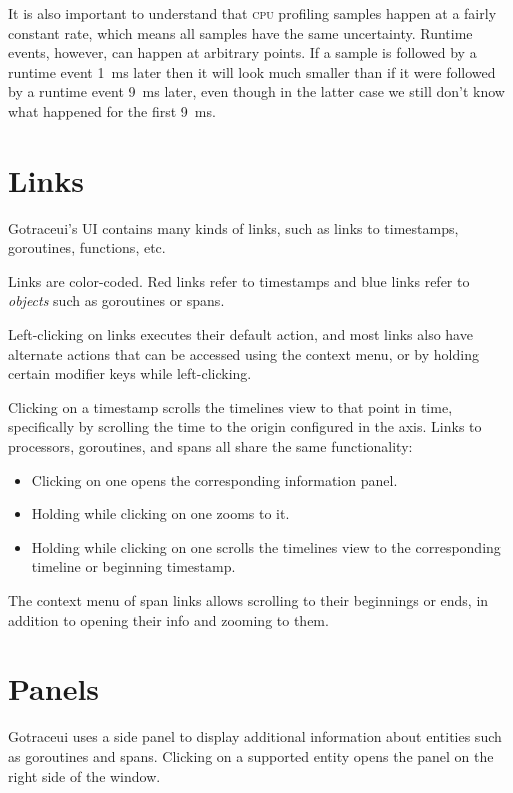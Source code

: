 \documentclass[10pt,letterpaper,oneside,openany,english]{memoir}
\newcommand{\shortcut}{\ctrl{} or \cmdmac}
\begin{document}
It is also important to understand that \textsc{cpu} profiling samples happen at a fairly constant rate, which means all samples have the same uncertainty.
Runtime events, however, can happen at arbitrary points.
If a sample is followed by a runtime event \qty{1}{\milli\second} later then it will look much smaller than if it were followed by a runtime event \qty{9}{\milli\second} later,
even though in the latter case we still don't know what happened for the first \qty{9}{\milli\second}.

\section{Links}

Gotraceui's UI contains many kinds of links, such as links to timestamps, goroutines, functions, etc.

Links are color-coded. Red links refer to timestamps and blue links refer to \emph{objects} such as goroutines or spans.

Left-clicking on links executes their default action,
and most links also have alternate actions that can be accessed using the context menu,
or by holding certain modifier keys while left-clicking.

Clicking on a timestamp scrolls the timelines view to that point in time, specifically by scrolling the time to the origin configured in the axis.
Links to processors, goroutines, and spans all share the same functionality:
\begin{itemize}
\item Clicking on one opens the corresponding information panel.
\item Holding \keys{\shortcut} while clicking on one zooms to it.
\item Holding \keys{\shift} while clicking on one scrolls the timelines view to the corresponding timeline or beginning timestamp.
\end{itemize}

The context menu of span links allows scrolling to their beginnings or ends, in addition to opening their info and zooming to them.

\section{Panels}\label{panels}

Gotraceui uses a side panel to display additional information about entities such as goroutines and spans.
Clicking on a supported entity opens the panel on the right side of the window.
\end{document}
